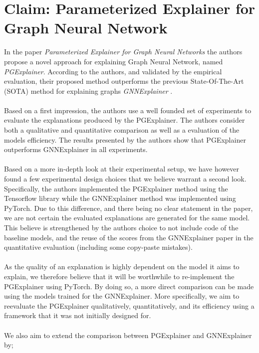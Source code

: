 \documentclass{article}
\begin{document}
\section*{Claim: Parameterized Explainer for Graph Neural Network}
In the paper \textit{Parameterized Explainer for Graph Neural Networks} \cite{luo2020parameterized} the authors propose a novel approach for explaining Graph Neural Network, named \textit{PGExplainer}. According to the authors, and validated by the empirical evaluation, their proposed method outperforms the previous State-Of-The-Art (SOTA) method for explaining graphs \textit{GNNExplainer} \cite{ying2019gnnexplainer}.\\
\\
Based on a first impression, the authors use a well founded set of experiments to evaluate the explanations produced by the PGExplainer. The authors consider both a qualitative and quantitative comparison as well as a evaluation of the models efficiency. The results presented by the authors show that PGExplainer outperforms GNNExplainer in all experiments.\\
\\
Based on a more in-depth look at their experimental setup, we have however found a few experimental design choices that we believe warrant a second look. Specifically, the authors implemented the PGExplainer method using the Tensorflow library while the GNNExplainer method was implemented using PyTorch. Due to this difference, and there being no clear statement in the paper, we are not certain the evaluated explanations are generated for the same model. This believe is strengthened by the authors choice to not include code of the baseline models, and the reuse of the scores from the GNNExplainer paper in the quantitative evaluation (including some copy-paste mistakes).\\ 
\\
As the quality of an explanation is highly dependent on the model it aims to explain, we therefore believe that it will be worthwhile to re-implement the PGExplainer using PyTorch. By doing so, a more direct comparison can be made using the models trained for the GNNExplainer. More specifically, we aim to reevaluate the PGExplainer qualitatively, quantitatively, and its efficiency using a framework that it was not initially designed for. \\
\\
We also aim to extend the comparison between PGExplainer and GNNExplainer by;
\end{document}
